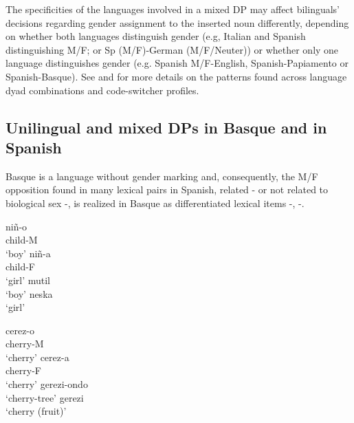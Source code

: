 \documentclass[output=paper]{langscibook}
\begin{document}
{The specificities of the languages involved in a mixed DP may affect bilinguals’ decisions regarding gender assignment to the inserted noun differently, depending on whether both languages distinguish gender (e.g, Italian and Spanish distinguishing M/F; or Sp (M/F)-German (M/F/Neuter)) or whether only one language distinguishes gender (e.g. Spanish M/F-English, Spanish-Papiamento or Spanish-Basque). See}  and \citet{BellamyParafitaCouto2022} {for more details on the patterns found across language dyad combinations and code-switcher profiles.}

\subsection{Unilingual and mixed DPs in Basque and in Spanish}\label{sec:ezeiza:2.1}

Basque is a language without gender marking and, consequently, the M/F opposition found in many lexical pairs in Spanish, related - or not related to biological sex -, is realized in Basque as differentiated lexical items -, -.

\ea\label{ex:ezeiza:5}
  \ea\label{ex:ezeiza:5a}
    niñ-o\\
    child-M\\
    \glt ‘boy’
  \ex\label{ex:ezeiza:5b}
    niñ-a\\
    child-F\\
    \glt ‘girl’
  \ex\label{ex:ezeiza:5c}
    mutil\\
    \glt ‘boy’
  \ex\label{ex:ezeiza:5d}
    neska\\
    \glt ‘girl’
  \z
\z


\ea\label{ex:ezeiza:6}
  \ea\label{ex:ezeiza:6a}
    \gll cerez-o\\
         cherry-M\\
    \glt ‘cherry’
  \ex\label{ex:ezeiza:6b}
    \gll cerez-a\\
         cherry-F\\
    \glt ‘cherry’
  \ex\label{ex:ezeiza:6c}
    gerezi-ondo\\
    \glt ‘cherry-tree’
  \ex\label{ex:ezeiza:6d}
    gerezi\\
    \glt ‘cherry (fruit)’
  \z
\z
\end{document}
